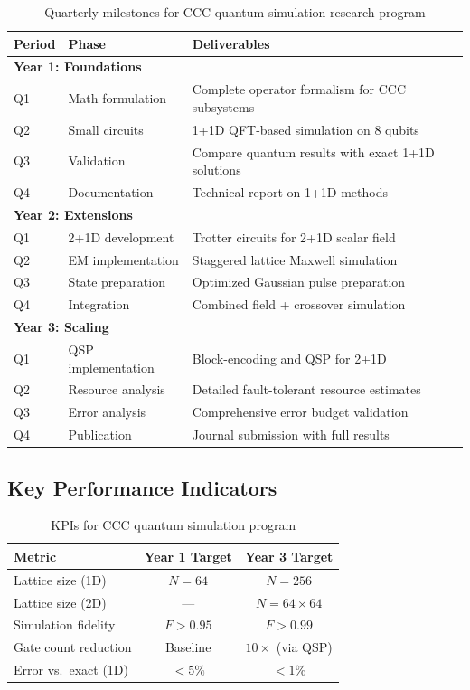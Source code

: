\documentclass[11pt,a4paper]{article}
\theoremstyle{plain}
\theoremstyle{definition}
\theoremstyle{remark}
\begin{document}
\begin{table}[h]
\centering
\caption{Quarterly milestones for CCC quantum simulation research program}
\label{tab:milestones}
\small
\begin{tabular}{llp{8cm}}
\toprule
\textbf{Period} & \textbf{Phase} & \textbf{Deliverables} \\
\midrule
\multicolumn{3}{l}{\textbf{Year 1: Foundations}} \\
Q1 & Math formulation & Complete operator formalism for CCC subsystems \\
Q2 & Small circuits & 1+1D QFT-based simulation on 8 qubits \\
Q3 & Validation & Compare quantum results with exact 1+1D solutions \\
Q4 & Documentation & Technical report on 1+1D methods \\
\midrule
\multicolumn{3}{l}{\textbf{Year 2: Extensions}} \\
Q1 & 2+1D development & Trotter circuits for 2+1D scalar field \\
Q2 & EM implementation & Staggered lattice Maxwell simulation \\
Q3 & State preparation & Optimized Gaussian pulse preparation \\
Q4 & Integration & Combined field + crossover simulation \\
\midrule
\multicolumn{3}{l}{\textbf{Year 3: Scaling}} \\
Q1 & QSP implementation & Block-encoding and QSP for 2+1D \\
Q2 & Resource analysis & Detailed fault-tolerant resource estimates \\
Q3 & Error analysis & Comprehensive error budget validation \\
Q4 & Publication & Journal submission with full results \\
\bottomrule
\end{tabular}
\end{table}

\subsection{Key Performance Indicators}

\begin{table}[h]
\centering
\caption{KPIs for CCC quantum simulation program}
\label{tab:kpis}
\begin{tabular}{lcc}
\toprule
\textbf{Metric} & \textbf{Year 1 Target} & \textbf{Year 3 Target} \\
\midrule
Lattice size (1D) & $N = 64$ & $N = 256$ \\
Lattice size (2D) & --- & $N = 64 \times 64$ \\
Simulation fidelity & $F > 0.95$ & $F > 0.99$ \\
Gate count reduction & Baseline & $10\times$ (via QSP) \\
Error vs.\ exact (1D) & $< 5\%$ & $< 1\%$ \\
\bottomrule
\end{tabular}
\end{table}
\end{document}
